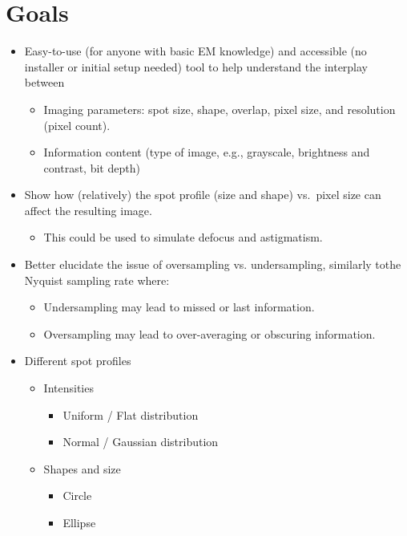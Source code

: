 \documentclass{article}
\begin{document}
\section{Goals}
\begin{itemize}
  \item Easy-to-use (for anyone with basic EM knowledge) and accessible (no
  installer or initial setup needed) tool to help understand the interplay between
  \begin{itemize}
  \item Imaging parameters: spot size, shape, overlap, pixel size, and resolution
  (pixel count).
  \item Information content (type of image, e.g., grayscale, brightness and
  contrast, bit depth)
  \end{itemize}
  \item Show how (relatively) the spot profile (size and shape) vs.\ pixel size
  can affect the resulting image.
  \begin{itemize}
    \item This could be used to simulate defocus and astigmatism.
  \end{itemize}
  \item Better elucidate the issue of oversampling vs. undersampling, similarly
  tothe Nyquist sampling rate where:
  \begin{itemize}
    \item Undersampling may lead to missed or last information.
    \item Oversampling may lead to over-averaging or obscuring information.
  \end{itemize}
  \item Different spot profiles
  \begin{itemize}
    \item Intensities
    \begin{itemize}
    \item Uniform / Flat distribution
    \item Normal / Gaussian distribution
    \end{itemize}
    \item Shapes and size
    \begin{itemize}
    \item Circle
    \item Ellipse
    \end{itemize}
  \end{itemize}
\end{itemize}
\end{document}
